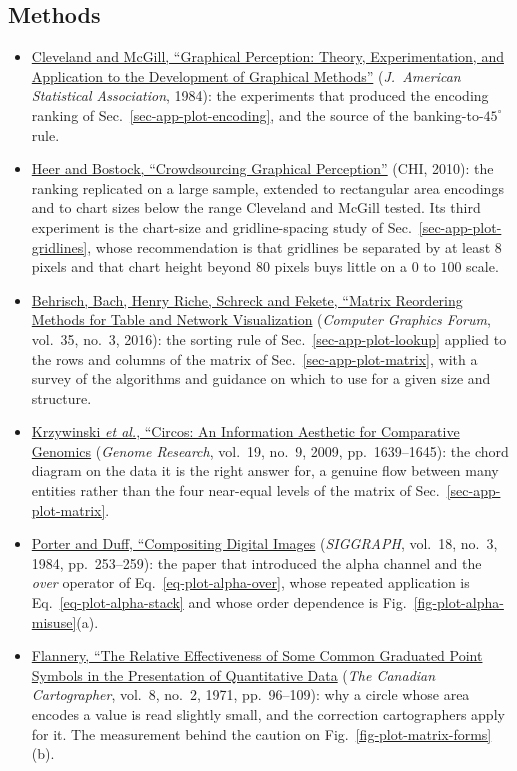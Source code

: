 \subsection*{Methods}
\begin{itemize}
	\item \href{https://doi.org/10.1080/01621459.1984.10478080}{Cleveland and McGill, ``Graphical Perception: Theory, Experimentation, and Application to the Development of Graphical Methods''} (\emph{J.\ American Statistical Association}, 1984): the experiments that produced the encoding ranking of Sec.~\ref{sec-app-plot-encoding}, and the source of the banking-to-$45^{\circ}$ rule.
	\item \href{https://doi.org/10.1145/1753326.1753357}{Heer and Bostock, ``Crowdsourcing Graphical Perception''} (CHI, 2010): the ranking replicated on a large sample, extended to rectangular area encodings and to chart sizes below the range Cleveland and McGill tested. Its third experiment is the chart-size and gridline-spacing study of Sec.~\ref{sec-app-plot-gridlines}, whose recommendation is that gridlines be separated by at least $8$ pixels and that chart height beyond $80$ pixels buys little on a $0$ to $100$ scale.
\item \href{https://doi.org/10.1111/cgf.12935}{Behrisch, Bach, Henry Riche, Schreck and Fekete, ``Matrix Reordering Methods for Table and Network Visualization} (\emph{Computer Graphics Forum}, vol.~35, no.~3, 2016): the sorting rule of Sec.~\ref{sec-app-plot-lookup} applied to the rows and columns of the matrix of Sec.~\ref{sec-app-plot-matrix}, with a survey of the algorithms and guidance on which to use for a given size and structure.
\item \href{https://doi.org/10.1101/gr.092759.109}{Krzywinski \emph{et al.}, ``Circos: An Information Aesthetic for Comparative Genomics} (\emph{Genome Research}, vol.~19, no.~9, 2009, pp.~1639--1645): the chord diagram on the data it is the right answer for, a genuine flow between many entities rather than the four near-equal levels of the matrix of Sec.~\ref{sec-app-plot-matrix}.
\item \href{https://doi.org/10.1145/964965.808606}{Porter and Duff, ``Compositing Digital Images} (\emph{SIGGRAPH}, vol.~18, no.~3, 1984, pp.~253--259): the paper that introduced the alpha channel and the \emph{over} operator of Eq.~\eqref{eq-plot-alpha-over}, whose repeated application is Eq.~\eqref{eq-plot-alpha-stack} and whose order dependence is Fig.~\ref{fig-plot-alpha-misuse}(a).
\item \href{https://doi.org/10.3138/J647-1776-745H-3667}{Flannery, ``The Relative Effectiveness of Some Common Graduated Point Symbols in the Presentation of Quantitative Data} (\emph{The Canadian Cartographer}, vol.~8, no.~2, 1971, pp.~96--109): why a circle whose area encodes a value is read slightly small, and the correction cartographers apply for it. The measurement behind the caution on Fig.~\ref{fig-plot-matrix-forms}(b).

\end{itemize}
